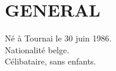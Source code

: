 \section{GENERAL}

\vspace{0.50cm}

Né à Tournai le 30 juin 1986.\\
Nationalité belge.\\
Célibataire, sans enfants.
